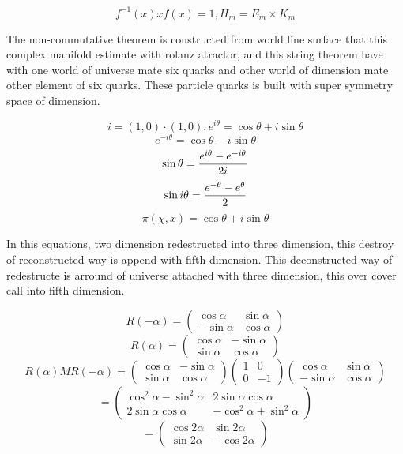 \documentclass{jsarticle}
\begin{document}
   $$ f^{-1}(x)xf(x) = 1,H_m = E_m \times K_m $$


   The non-commutative theorem is constructed from world line surface that
   this complex manifold estimate with rolanz atractor, and this string
   theorem have with one world of universe mate six quarks and other world of
   dimension mate other element of six quarks.
   These particle quarks is built with super symmetry space of dimension.

   $$ i = (1,0)\cdot (1,0), e^{i\theta} = \cos \theta + i \sin \theta $$
   $$ e^{-i \theta} = \cos \theta - i\sin \theta $$
   $$ \sin \theta = {e^{i \theta} - e^{-i \theta} \over 2i} $$
   $$ \sin i \theta = {e^{-\theta} - e^{\theta} \over 2} $$
   $$ \pi (\chi,x) = \cos \theta + i \sin \theta $$

   In this equations, two dimension redestructed into three dimension,
   this destroy of reconstructed way is append with fifth dimension.
   This deconstructed way of redestructe is arround of universe attached
   with three dimension, this over cover call into fifth dimension.

   $$ R(-\alpha) = \begin{pmatrix} \cos \alpha & \sin \alpha \\
   - \sin \alpha & \cos \alpha \end{pmatrix} $$
   $$ R(\alpha) = \begin{pmatrix} \cos \alpha & - \sin \alpha \\
   \sin \alpha & \cos \alpha \end{pmatrix} $$
   $$ R(\alpha)M R(-\alpha) = 
   \begin{pmatrix} \cos \alpha & - \sin \alpha \\
   \sin \alpha & \cos \alpha \end{pmatrix} \begin{pmatrix} 1 & 0 \\
   0 & - 1 \end{pmatrix} \begin{pmatrix} \cos \alpha & \sin \alpha \\
   - \sin \alpha & \cos \alpha \end{pmatrix} $$
   $$ = \begin{pmatrix} \cos^2 \alpha - \sin^2 \alpha & 2 \sin \alpha \cos 
	   \alpha \\
	   2 \sin \alpha \cos \alpha & - \cos^2 \alpha + \sin^2 \alpha
   \end{pmatrix} $$
   $$ = \begin{pmatrix} \cos 2 \alpha & \sin 2 \alpha \\
   \sin 2 \alpha & - \cos 2 \alpha \end{pmatrix} $$
\end{document}
